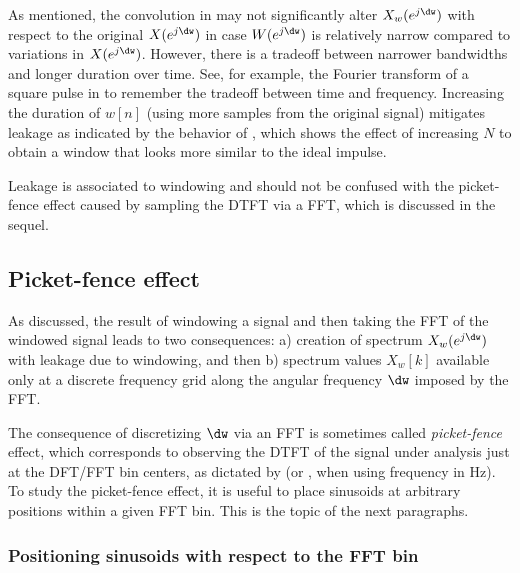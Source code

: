 As mentioned, the convolution in  may not significantly alter $X_w(e^{j \dw})$ with respect to the original $X(e^{j \dw})$ in case $W(e^{j \dw})$ is relatively narrow compared to variations in $X(e^{j \dw})$. However, there
is a tradeoff between narrower bandwidths and longer duration over time. See, for example, the Fourier transform of a square pulse in  to remember the tradeoff between time and frequency.
Increasing the duration of $w[n]$ (using more samples from the original signal) mitigates leakage as indicated by the behavior of , which shows the effect of increasing $N$ to obtain
a window that looks more similar to the ideal impulse.

Leakage is associated to windowing and should not be confused with the picket-fence effect caused by sampling the DTFT via a FFT, which is discussed in the sequel.

\subsection{Picket-fence effect}

As discussed, the result of windowing a signal and then taking the FFT of the windowed signal leads to two consequences: a) creation of spectrum $X_w(e^{j \dw})$ with leakage due to windowing, and then b) spectrum values $X_w[k]$ available only at a discrete frequency grid along the angular frequency $\dw$ imposed by the FFT.

The consequence of discretizing $\dw$ via an FFT is sometimes called \emph{picket-fence} effect, which corresponds to observing the DTFT of the signal under analysis just at the DFT/FFT bin centers, as dictated by  (or , when using frequency in Hz).
To study the picket-fence effect, it is useful to place sinusoids at arbitrary positions within a given FFT bin. This is the topic of the next paragraphs.

\subsubsection{Positioning sinusoids with respect to the FFT bin}


